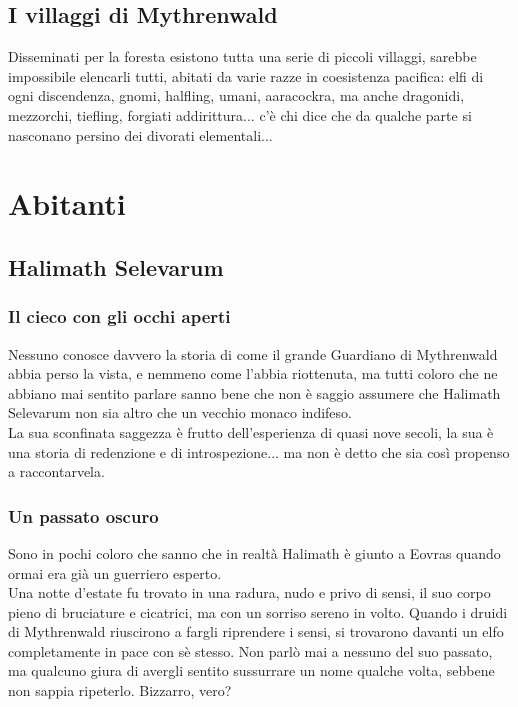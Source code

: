 \subsection{I villaggi di Mythrenwald}

Disseminati per la foresta esistono tutta una serie di piccoli villaggi, sarebbe impossibile elencarli tutti, abitati da varie razze in coesistenza pacifica: elfi di ogni discendenza, gnomi, halfling, umani, aaracockra, ma anche dragonidi, mezzorchi, tiefling, forgiati addirittura... c'è chi dice che da qualche parte si nasconano persino dei divorati elementali...

\section{Abitanti}

\subsection{Halimath Selevarum}

\subsubsection{Il cieco con gli occhi aperti}

Nessuno conosce davvero la storia di come il grande Guardiano di Mythrenwald abbia perso la vista, e nemmeno come l'abbia riottenuta, ma tutti coloro che ne abbiano mai sentito parlare sanno bene che non è saggio assumere che Halimath Selevarum non sia altro che un vecchio monaco indifeso. \\ La sua sconfinata saggezza è frutto dell'esperienza di quasi nove secoli, la sua è una storia di redenzione e di introspezione... ma non è detto che sia così propenso a raccontarvela.

\subsubsection{Un passato oscuro}

Sono in pochi coloro che sanno che in realtà Halimath è giunto a Eovras quando ormai era già un guerriero esperto. \\ Una notte d'estate fu trovato in una radura, nudo e privo di sensi, il suo corpo pieno di bruciature e cicatrici, ma con un sorriso sereno in volto. Quando i druidi di Mythrenwald riuscirono a fargli riprendere i sensi, si trovarono davanti un elfo completamente in pace con sè stesso. Non parlò mai a nessuno del suo passato, ma qualcuno giura di avergli sentito sussurrare un nome qualche volta, sebbene non sappia ripeterlo. Bizzarro, vero?

